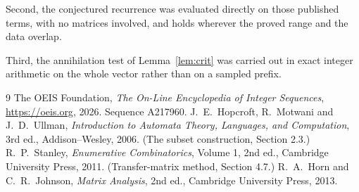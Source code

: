 \documentclass[11pt,a4paper]{article}
\theoremstyle{plain}
\theoremstyle{definition}
\begin{document}
Second, the conjectured recurrence was evaluated directly on those published terms, with no
matrices involved, and holds wherever the proved range and the data overlap.

Third, the annihilation test of Lemma~\ref{lem:crit} was carried out in exact integer
arithmetic on the whole vector rather than on a sampled prefix.

\begin{thebibliography}{9}
 The OEIS Foundation, \emph{The On-Line Encyclopedia of Integer
Sequences}, \url{https://oeis.org}, 2026. Sequence A217960.
 J.~E.~Hopcroft, R.~Motwani and J.~D.~Ullman, \emph{Introduction to Automata
Theory, Languages, and Computation}, 3rd ed., Addison--Wesley, 2006. (The subset
construction, Section 2.3.)
 R.~P.~Stanley, \emph{Enumerative Combinatorics}, Volume 1, 2nd ed.,
Cambridge University Press, 2011. (Transfer-matrix method, Section 4.7.)
 R.~A.~Horn and C.~R.~Johnson, \emph{Matrix Analysis}, 2nd ed., Cambridge
University Press, 2013.
\end{thebibliography}
\end{document}
